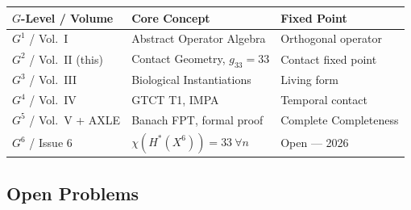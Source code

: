 \documentclass[11pt]{article}
\theoremstyle{boxed}
\begin{document}
\begin{center}
\begin{tabular}{lll}
\toprule
\textbf{$G$-Level / Volume} & \textbf{Core Concept} & \textbf{Fixed Point}\\
\midrule
$G^1$ / Vol.~I               & Abstract Operator Algebra        & Orthogonal operator\\
$G^2$ / Vol.~II (this)       & Contact Geometry, $g_{33} = 33$  & Contact fixed point\\
$G^3$ / Vol.~III             & Biological Instantiations         & Living form\\
$G^4$ / Vol.~IV              & GTCT T1, IMPA                     & Temporal contact\\
$G^5$ / Vol.~V + AXLE        & Banach FPT, formal proof          & Complete Completeness\\
$G^6$ / Issue 6              & $\chi(H^{*}(X^{6})) = 33\ \forall n$ & Open --- 2026\\
\bottomrule
\end{tabular}
\end{center}

\subsection{Open Problems}
\end{document}
